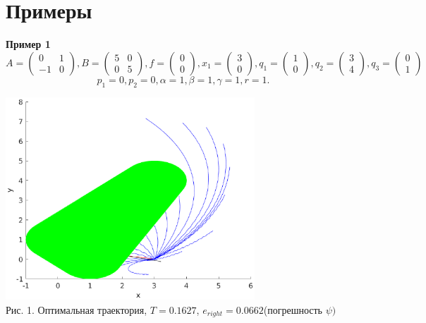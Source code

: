 \documentclass[11pt]{article}
\begin{document}
	{\section{Примеры}}
	{\textbf{Пример 1}}
	\[A = \begin{pmatrix}
	0&1\\
	-1&0
	\end{pmatrix},
	B = \begin{pmatrix}
	5&0\\
	0&5
	\end{pmatrix},
	f = \begin{pmatrix}
	0\\
	0
	\end{pmatrix} ,
	x_1 = \begin{pmatrix}
	3\\
	0
	\end{pmatrix},
	q_1 = \begin{pmatrix}
	1\\
	0
	\end{pmatrix},
	q_2 = \begin{pmatrix}
	3\\
	4
	\end{pmatrix},
	q_3 = \begin{pmatrix}
	0\\
	1
	\end{pmatrix} \]
	\[p_1 = 0, p_2 = 0, \alpha = 1,\beta = 1,\gamma = 1,r = 1. \]
	\begin{center}
		\includegraphics[width=0.7\textwidth]{pic_1.eps}\\
		{Рис. 1. Оптимальная траектория, $T = 0.1627$, $e_{right} = 0.0662$(погрешность $\psi) $}
	\end{center}
	
\end{document}
